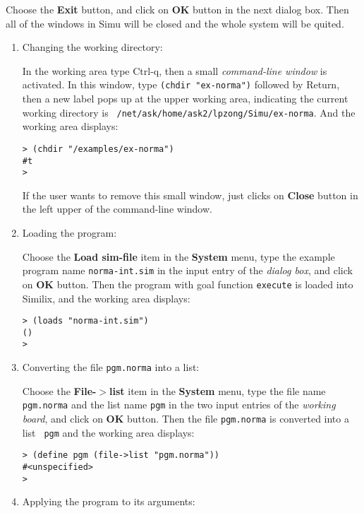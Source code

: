 \begin{sloppypar}
\begin{enumerate}
     Choose the {\bf Exit} button, and click on {\bf OK} button in the
next dialog box. Then all of the windows in Simu will be closed and
the whole system will be quited.
\end{enumerate}

\begin{enumerate}

\item Changing the working directory:

In the working area type Ctrl-q, then a small {\it command-line
window} is activated. In this window, type {\tt (chdir "ex-norma")}
followed by Return, then a new label pops up at the upper working
area, indicating the current working directory is {\tt
/net/ask/home/ask2/lpzong/Simu/ex-norma}. And the working area
displays:

\begin{verbatim}
> (chdir "/examples/ex-norma")
#t
>
\end{verbatim}

If the user wants to remove this small window, just clicks on {\bf
Close} button in the left upper of the command-line window.

\item Loading the program:

   Choose the {\bf Load sim-file} item in the {\bf System} menu, type
the example program name {\tt norma-int.sim} in the input entry of the
{\it dialog box}, and click on {\bf OK} button.  Then the program with
goal function {\tt execute} is loaded into Similix, and the working
area displays:

\begin{verbatim}
> (loads "norma-int.sim")
()
>
\end{verbatim}

\item Converting the file {\tt pgm.norma} into a list:

   Choose the {\bf File-$>$list} item in the {\bf System} menu, type
the file name {\tt pgm.norma} and the list name {\tt pgm} in the two
input entries of the {\it working board}, and click on {\bf OK}
button. Then the file {\tt pgm.norma} is converted into a list {\tt
pgm} and the working area displays:

\begin{verbatim}
> (define pgm (file->list "pgm.norma"))
#<unspecified>
>
\end{verbatim}

\item Applying the program to its arguments:


\end{enumerate}
\end{sloppypar}
